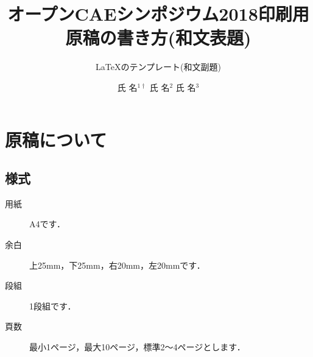 \documentclass{ltjoc}
\title{オープンCAEシンポジウム2018印刷用原稿の書き方(和文表題)}
\subtitle{\LaTeX のテンプレート(和文副題)}
\author{%
氏 名$^{1\dagger}$%
\hspace{1\zw}%
氏 名$^{2}$%
\hspace{1\zw}%
氏 名$^{3}$%
}
\affiliation{%
${}^{1}$所属%
\hspace{1\zw}%
${}^{2}$所属%
\hspace{1\zw}%
${}^{3}$所属%
}
\begin{document}
\maketitle
\section{原稿について}
\subsection{様式}
\begin{description}
\item [用紙]
  A4です．
\item [余白]
  上25mm，下25mm，右20mm，左20mmです．
\item [段組]
  1段組です．
\item [頁数]
  最小1ページ，最大10ページ，標準2〜4ページとします．
\end{description}
\end{document}
